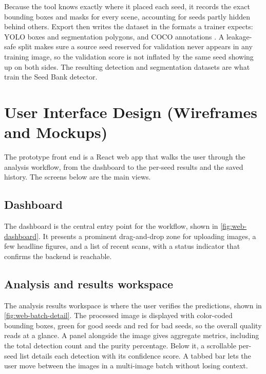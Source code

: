 Because the tool knows exactly where it placed each seed, it records the exact
bounding boxes and masks for every scene, accounting for seeds partly hidden
behind others. Export then writes the dataset in the formats a trainer expects:
YOLO boxes and segmentation polygons, and COCO annotations \cite{lin2014coco}. A
leakage-safe split makes sure a source seed reserved for validation never appears
in any training image, so the validation score is not inflated by the same seed
showing up on both sides. The resulting detection and segmentation datasets are
what train the Seed Bank detector.

\section{User Interface Design (Wireframes and Mockups)}

The prototype front end is a React web app that walks the user through the
analysis workflow, from the dashboard to the per-seed results and the saved
history. The screens below are the main views.

\subsection{Dashboard}

The dashboard is the central entry point for the workflow, shown in
\autoref{fig:web-dashboard}. It presents a prominent drag-and-drop zone for
uploading images, a few headline figures, and a list of recent scans, with a
status indicator that confirms the backend is reachable.


\subsection{Analysis and results workspace}

The analysis results workspace is where the user verifies the predictions, shown
in \autoref{fig:web-batch-detail}. The processed image is displayed with
color-coded bounding boxes, green for good seeds and red for bad seeds, so the
overall quality reads at a glance. A panel alongside the image gives aggregate
metrics, including the total detection count and the purity percentage. Below it,
a scrollable per-seed list details each detection with its confidence score. A
tabbed bar lets the user move between the images in a multi-image batch without
losing context.

